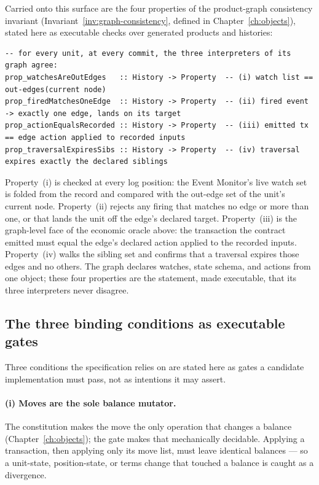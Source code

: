 Carried onto this surface are the four properties of the product-graph consistency invariant
(Invariant~\ref{inv:graph-consistency}, defined in Chapter~\ref{ch:objects}), stated here as
executable checks over generated products and histories:

\begin{lstlisting}
-- for every unit, at every commit, the three interpreters of its graph agree:
prop_watchesAreOutEdges   :: History -> Property  -- (i) watch list == out-edges(current node)
prop_firedMatchesOneEdge  :: History -> Property  -- (ii) fired event -> exactly one edge, lands on its target
prop_actionEqualsRecorded :: History -> Property  -- (iii) emitted tx == edge action applied to recorded inputs
prop_traversalExpiresSibs :: History -> Property  -- (iv) traversal expires exactly the declared siblings
\end{lstlisting}

Property~(i) is checked at every log position: the Event Monitor's live watch set is folded
from the record and compared with the out-edge set of the unit's current node. Property~(ii)
rejects any firing that matches no edge or more than one, or that lands the unit off the
edge's declared target. Property~(iii) is the graph-level face of the economic oracle above:
the transaction the contract emitted must equal the edge's declared action applied to the
recorded inputs. Property~(iv) walks the sibling set and confirms that a traversal expires
those edges and no others. The graph declares watches, state schema, and actions from one
object; these four properties are the statement, made executable, that its three interpreters
never disagree.

\subsection{The three binding conditions as executable gates}

Three conditions the specification relies on are stated here as gates a candidate
implementation must pass, not as intentions it may assert.

\paragraph{(i) Moves are the sole balance mutator.}
The constitution makes the move the only operation that changes a balance
(Chapter~\ref{ch:objects}); the gate makes that mechanically decidable. Applying a
transaction, then applying only its move list, must leave identical balances --- so a
unit-state, position-state, or terms change that touched a balance is caught as a divergence.

